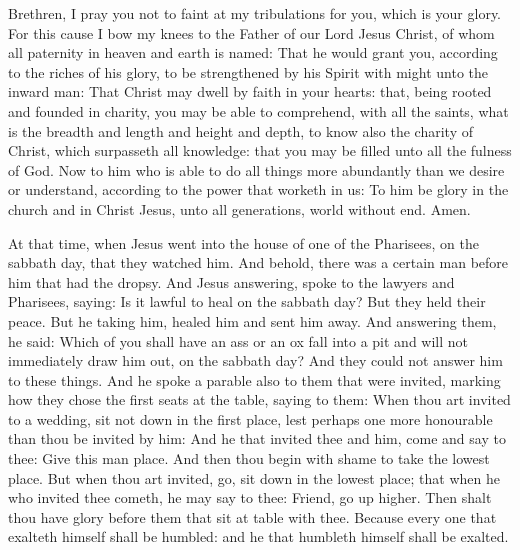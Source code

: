 \begin{multicols}{2}
Brethren, I pray you not to faint at my tribulations for you,
which is your glory.
For this cause I bow my knees to the Father of our Lord Jesus
Christ,
of whom all paternity in heaven and earth is named:
That he would grant you, according to the riches of his glory, to
be strengthened by his Spirit with might unto the inward man:
That Christ may dwell by faith in your hearts: that, being rooted
and founded in charity,
you may be able to comprehend, with all the saints, what is the
breadth and length and height and depth,
to know also the charity of Christ, which surpasseth all
knowledge: that you may be filled unto all the fulness of God.
Now to him who is able to do all things more abundantly than we
desire or understand, according to the power that worketh in us:
To him be glory in the church and in Christ Jesus, unto all
generations, world without end. Amen.



At that time, when Jesus went into the house of one of the
Pharisees, on the sabbath day, that they watched him.
And behold, there was a certain man before him that had the
dropsy.
And Jesus answering, spoke to the lawyers and Pharisees, saying:
Is it lawful to heal on the sabbath day?
But they held their peace. But he taking him, healed him and sent
him away.
And answering them, he said: Which of you shall have an ass or an
ox fall into a pit and will not immediately draw him out, on the sabbath
day?
And they could not answer him to these things.
And he spoke a parable also to them that were invited, marking how
they chose the first seats at the table, saying to them:
When thou art invited to a wedding, sit not down in the first
place, lest perhaps one more honourable than thou be invited by him:
And he that invited thee and him, come and say to thee: Give this
man place. And then thou begin with shame to take the lowest place.
But when thou art invited, go, sit down in the lowest place; that
when he who invited thee cometh, he may say to thee: Friend, go up
higher. Then shalt thou have glory before them that sit at table with
thee.
Because every one that exalteth himself shall be humbled: and he
that humbleth himself shall be exalted.



\bigskip



\end{multicols}
